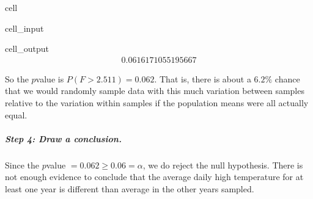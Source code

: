 \documentclass[letterpaper,10pt,english]{jupyterBook}
\begin{document}
\begin{sphinxuseclass}{cell}\begin{sphinxVerbatimInput}

\begin{sphinxuseclass}{cell_input}
\begin{sphinxVerbatim}[commandchars=\\\{\}]
\end{sphinxVerbatim}

\end{sphinxuseclass}\end{sphinxVerbatimInput}
\begin{sphinxVerbatimOutput}

\begin{sphinxuseclass}{cell_output}\begin{equation*}
\begin{split}0.0616171055195667\end{split}
\end{equation*}
\end{sphinxuseclass}\end{sphinxVerbatimOutput}

\end{sphinxuseclass}
\sphinxAtStartPar
So the \(p\)\sphinxhyphen{}value is \(P(F > 2.511) = 0.062\). That is, there is about a \(6.2\%\) chance that we would randomly sample data with this much variation between samples relative to the variation within samples if the population means were all actually equal.


\subparagraph{Step 4: Draw a conclusion.}
\label{\detokenize{Ch9 Hypothesis Tests of Two or More Populations/9.3 ANOVA:step-4-draw-a-conclusion}}
\sphinxAtStartPar
Since the \(p\)\sphinxhyphen{}value \(= 0.062 \geq 0.06 = \alpha\), we do  reject the null hypothesis. There is not enough evidence to conclude that the average daily high temperature for at least one year is different than average in the other years sampled.






\renewcommand{\indexname}{Proof Index}
\begin{sphinxtheindex}
\let\bigletter\sphinxstyleindexlettergroup
\bigletter{theorem\sphinxhyphen{}0}
\item\relax{}
\end{sphinxtheindex}

\renewcommand{\indexname}{Index}
\printindex
\end{document}
